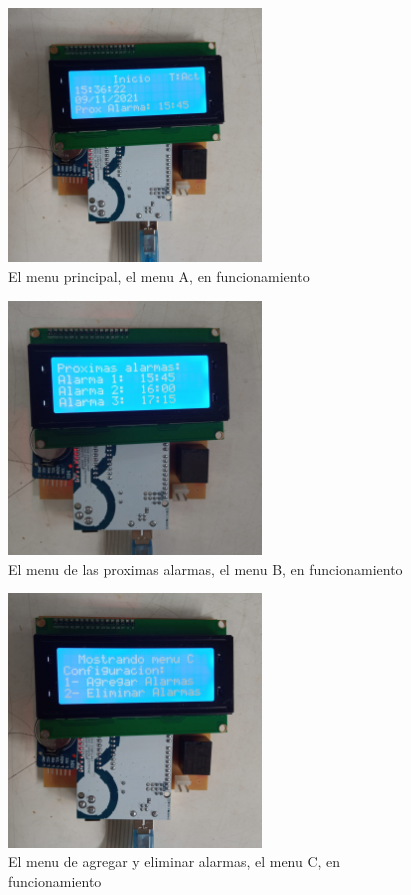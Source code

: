 \documentclass{article}
\begin{document}
\begin{figure}[H]
	\includegraphics[width=0.6\textwidth]{anexos/imagen6.jpg}
	\centering
	\caption{El menu principal, el menu A, en funcionamiento}
\end{figure}

\begin{figure}[H]
	\includegraphics[width=0.6\textwidth]{anexos/imagen4.jpg}
	\centering
	\caption{El menu de las proximas alarmas, el menu B, en funcionamiento}
\end{figure}

\begin{figure}[H]
	\includegraphics[width=0.6\textwidth]{anexos/imagen3.jpg}
	\centering
	\caption{El menu de agregar y eliminar alarmas, el menu C, en funcionamiento}
\end{figure}
\end{document}

